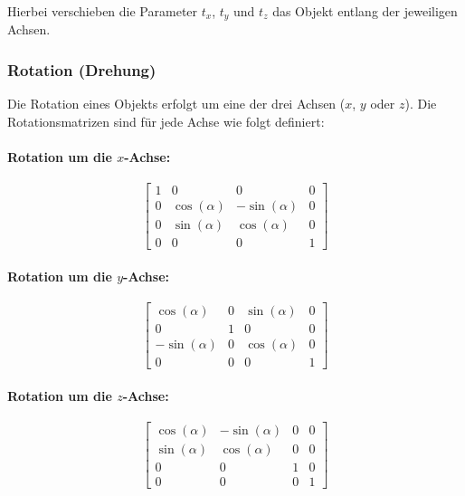 Hierbei verschieben die Parameter \(t_x\), \(t_y\) und \(t_z\) das Objekt entlang der jeweiligen Achsen.

\subsubsection{Rotation (Drehung)}

Die Rotation eines Objekts erfolgt um eine der drei Achsen (\(x\), \(y\) oder \(z\)). Die Rotationsmatrizen sind für jede Achse wie folgt definiert:

\paragraph{Rotation um die \(x\)-Achse:}
\begin{equation}
\begin{bmatrix}
1 & 0 & 0 & 0 \\
0 & \cos(\alpha) & -\sin(\alpha) & 0 \\
0 & \sin(\alpha) & \cos(\alpha) & 0 \\
0 & 0 & 0 & 1
\end{bmatrix}
\end{equation}

\paragraph{Rotation um die \(y\)-Achse:}
\begin{equation}
\begin{bmatrix}
\cos(\alpha) & 0 & \sin(\alpha) & 0 \\
0 & 1 & 0 & 0 \\
-\sin(\alpha) & 0 & \cos(\alpha) & 0 \\
0 & 0 & 0 & 1
\end{bmatrix}
\end{equation}

\paragraph{Rotation um die \(z\)-Achse:}
\begin{equation}
\begin{bmatrix}
\cos(\alpha) & -\sin(\alpha) & 0 & 0 \\
\sin(\alpha) & \cos(\alpha) & 0 & 0 \\
0 & 0 & 1 & 0 \\
0 & 0 & 0 & 1
\end{bmatrix}
\end{equation}

